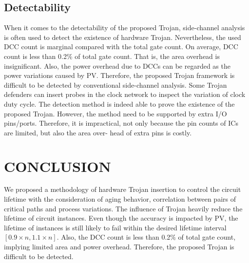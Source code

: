 \subsection{Detectability}
When it comes to the detectability of the proposed Trojan, side-channel analysis is often used to detect the existence of hardware Trojan. Nevertheless, the used DCC count is marginal compared with the total gate count. On average, DCC count is less than 0.2\% of total gate count. That is, the area overhead is insignificant. Also, the power overhead due to DCCs can be regarded as the power variations caused by PV. Therefore, the proposed Trojan framework is difficult to be detected by conventional side-channel analysis.
Some Trojan defenders can insert probes in the clock network to inspect the variation of clock duty cycle. The detection method is indeed able to prove the existence of the proposed Trojan. However, the method need to be supported by extra I/O pins/ports. Therefore, it is impractical, not only because the pin counts of ICs are limited, but also the area over- head of extra pins is costly.

\section{CONCLUSION}
We proposed a methodology of hardware Trojan insertion to control the circuit lifetime with the consideration of aging behavior, correlation between pairs of critical paths and process variations. The influence of Trojan heavily reduce the lifetime of circuit instances. Even though the accuracy is impacted by PV, the lifetime of instances is still likely to fail within the desired lifetime interval $[0.9 \times n, 1.1 \times n]$. Also, the DCC count is less than 0.2\% of total gate count, implying limited area and power overhead. Therefore, the proposed Trojan is difficult to be detected.
